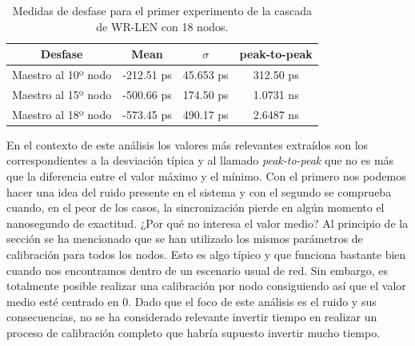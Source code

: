 \begin{table}
	\renewcommand{\arraystretch}{1.3}
	\caption{Medidas de desfase para el primer experimento de la cascada de 
	WR-LEN con 18 nodos.}
	\label{tab:cascada1}
	\centering
	\begin{tabular}{|c||c||c||c|}
		\hline
		Desfase & Mean & $\sigma$ & peak-to-peak \\
		\hline
		Maestro al 10º nodo & -212.51 ps & 45.653 ps & 312.50 ps \\
		\hline
		Maestro al 15º nodo & -500.66 ps & 174.50 ps & 1.0731 ns \\
		\hline
		Maestro al 18º nodo & -573.45 ps & 490.17 ps & 2.6487 ns \\
		\hline
	\end{tabular}
\end{table}

En el contexto de este análisis los valores más relevantes extraídos son los 
correspondientes a la desviación típica y al llamado \textit{peak-to-peak} que 
no es más que la diferencia entre el valor máximo y el mínimo. Con el primero 
nos podemos hacer una idea del ruido presente en el sistema y con el segundo se 
comprueba cuando, en el peor de los casos, la sincronización pierde en algún 
momento el nanosegundo de exactitud. ¿Por qué no interesa el valor medio? Al 
principio de la sección se ha mencionado que se han utilizado los mismos 
parámetros de calibración para todos los nodos. Esto es algo típico y que 
funciona bastante bien cuando nos encontramos dentro de un escenario usual de 
red. Sin embargo, es totalmente posible realizar una calibración por nodo 
consiguiendo así que el valor medio esté centrado en 0. Dado que el foco de 
este análisis es el ruido y sus consecuencias, no se ha considerado relevante 
invertir tiempo en realizar un proceso de calibración completo que habría 
supuesto invertir mucho tiempo.

